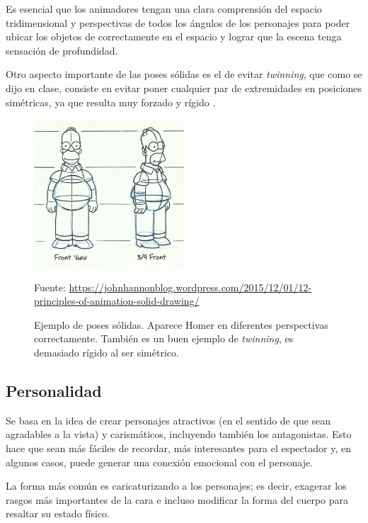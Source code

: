\documentclass{article}
\begin{document}
Es esencial que los animadores tengan una clara comprensión del espacio tridimensional y perspectivas de todos los ángulos de los personajes para poder ubicar los objetos de correctamente en el espacio y lograr que la escena tenga sensación de profundidad.

\bigskip

Otro aspecto importante de las poses sólidas es el de evitar \textit{twinning}, que como se dijo en clase, consiste en evitar poner cualquier par de extremidades en posiciones simétricas, ya que resulta muy forzado y rígido \cite{plural}.

\begin{figure}[H]
    \centering
    \includegraphics[width=0.5\textwidth]{imagenes/homer-solid-drawing.jpg}
    \caption{Ejemplo de poses sólidas. Aparece Homer en diferentes perspectivas correctamente. También es un buen ejemplo de \textit{twinning}, es demasiado rígido al ser simétrico.}
    \vspace{10pt}
    \footnotesize{Fuente: \url{https://johnhannonblog.wordpress.com/2015/12/01/12-principles-of-animation-solid-drawing/}}
\end{figure}

\subsection{Personalidad}

Se basa en la idea de crear personajes atractivos (en el sentido de que sean agradables a la vista) y carismáticos, incluyendo también los antagonistas. Esto hace que sean más fáciles de recordar, más interesantes para el espectador y, en algunos casos, puede generar una conexión emocional con el personaje. \cite{idearocket}

\bigskip

La forma más común es caricaturizando a los personajes; es decir, exagerar los rasgos más importantes de la cara e incluso modificar la forma del cuerpo para resaltar su estado físico.
\end{document}
